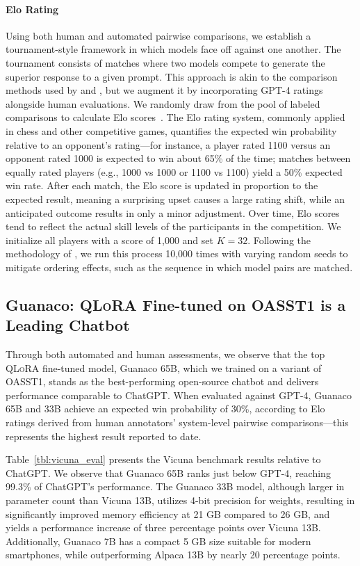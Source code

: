 \paragraph{Elo Rating} Using both human and automated pairwise comparisons, we establish a tournament-style framework in which models face off against one another. The tournament consists of matches where two models compete to generate the superior response to a given prompt. This approach is akin to the comparison methods used by \citet{bai2022training} and \citet{vicuna2023}, but we augment it by incorporating GPT-4 ratings alongside human evaluations. We randomly draw from the pool of labeled comparisons to calculate Elo scores~\citep{elo1967proposed,elo1978rating}. The Elo rating system, commonly applied in chess and other competitive games, quantifies the expected win probability relative to an opponent’s rating—for instance, a player rated 1100 versus an opponent rated 1000 is expected to win about 65\% of the time; matches between equally rated players (e.g., 1000 vs 1000 or 1100 vs 1100) yield a 50\% expected win rate. After each match, the Elo score is updated in proportion to the expected result, meaning a surprising upset causes a large rating shift, while an anticipated outcome results in only a minor adjustment. Over time, Elo scores tend to reflect the actual skill levels of the participants in the competition. We initialize all players with a score of 1,000 and set $K=32$. Following the methodology of \citet{vicuna2023}, we run this process 10,000 times with varying random seeds to mitigate ordering effects, such as the sequence in which model pairs are matched.

\subsection{\textbf{Guanaco}: \textsc{QLoRA} Fine-tuned on OASST1 is a Leading Chatbot} Through both automated and human assessments, we observe that the top \textsc{QLoRA} fine-tuned model, {Guanaco} 65B, which we trained on a variant of OASST1, stands as the best-performing open-source chatbot and delivers performance comparable to ChatGPT. When evaluated against GPT-4, {Guanaco} 65B and 33B achieve an expected win probability of 30\%, according to Elo ratings derived from human annotators' system-level pairwise comparisons—this represents the highest result reported to date.

Table~\ref{tbl:vicuna_eval} presents the Vicuna benchmark \cite{vicuna2023} results relative to ChatGPT. We observe that {Guanaco} 65B ranks just below GPT-4, reaching 99.3\% of ChatGPT's performance. The {Guanaco} 33B model, although larger in parameter count than Vicuna 13B, utilizes 4-bit precision for weights, resulting in significantly improved memory efficiency at 21 GB compared to 26 GB, and yields a performance increase of three percentage points over Vicuna 13B. Additionally, {Guanaco} 7B has a compact 5 GB size suitable for modern smartphones, while outperforming Alpaca 13B by nearly 20 percentage points.

